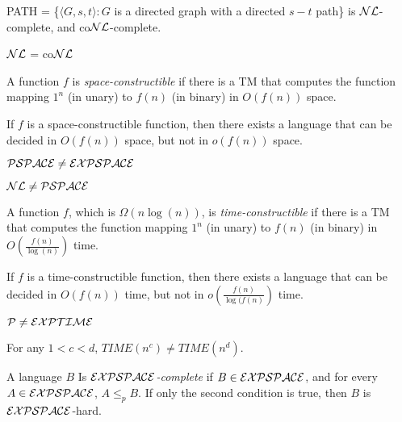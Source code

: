 \begin{theorem}
PATH = \{$\langle G, s, t\rangle : G$ is a directed graph with a directed $s-t$ path\} is $\mathcal{NL}$-complete, and co$\mathcal{NL}$-complete.
\end{theorem}

\begin{corollary}
$\mathcal{NL}$ = co$\mathcal{NL}$
\end{corollary}

\begin{definition}
A function $f$ is \emph{space-constructible} if there is a TM that computes the function mapping $1^n$ (in unary) to $f(n)$ (in binary) in $O(f(n))$ space.
\end{definition}

\begin{theorem}
If $f$ is a space-constructible function, then there exists a language that can be decided in $O(f(n))$ space, but not in $o(f(n))$ space.
\end{theorem}

\begin{corollary}
$\mathcal{PSPACE} \ne \mathcal{EXPSPACE}$
\end{corollary}

\begin{corollary}
$\mathcal{NL} \ne \mathcal{PSPACE}$
\end{corollary}

\begin{definition}
A function $f$, which is $\Omega(n\log(n))$, is \emph{time-constructible} if there is a TM that computes the function mapping $1^n$ (in unary) to $f(n)$ (in binary) in $O(\frac{f(n)}{\log(n)})$ time.
\end{definition}

\begin{theorem}
If $f$ is a time-constructible function, then there exists a language that can be decided in $O(f(n))$ time, but not in $o(\frac{f(n)}{\log(f(n)})$ time.
\end{theorem}

\begin{corollary}
$\mathcal{P} \ne \mathcal{EXPTIME}$
\end{corollary}

\begin{corollary}
For any $1 < c < d$, $TIME(n^c) \ne TIME(n^d)$.
\end{corollary}

\begin{definition}
A language $B$ Is \emph{$\mathcal{EXPSPACE}$-complete} if $B \in \mathcal{EXPSPACE}$, and for every $A \in \mathcal{EXPSPACE}$, $A \le_p B$. If only the second condition is true, then $B$ is $\mathcal{EXPSPACE}$-hard.
\end{definition}

